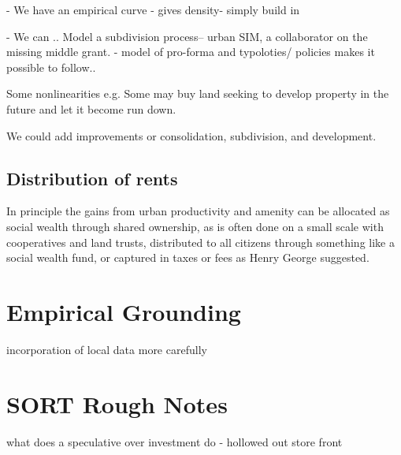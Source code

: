 - We have an empirical curve - gives density- simply build in

- We can .. Model a subdivision process-- urban SIM, a collaborator on the missing middle grant. - model of pro-forma and typoloties/ policies makes it possible to follow..

Some nonlinearities e.g. Some may buy land seeking to develop property in the future and let it become run down. 

We could add improvements
 or consolidation, subdivision, and development. 


\subsection{Distribution of rents}
In principle the gains from urban productivity and amenity can be allocated as social wealth through shared ownership, as is often done on a small scale with cooperatives and land trusts, distributed to all citizens through something like a social wealth fund, or captured in taxes or fees as Henry George suggested. 





\section{Empirical Grounding}
incorporation of local data more carefully

\section{SORT Rough Notes}
what does a speculative over investment do - hollowed out store front

